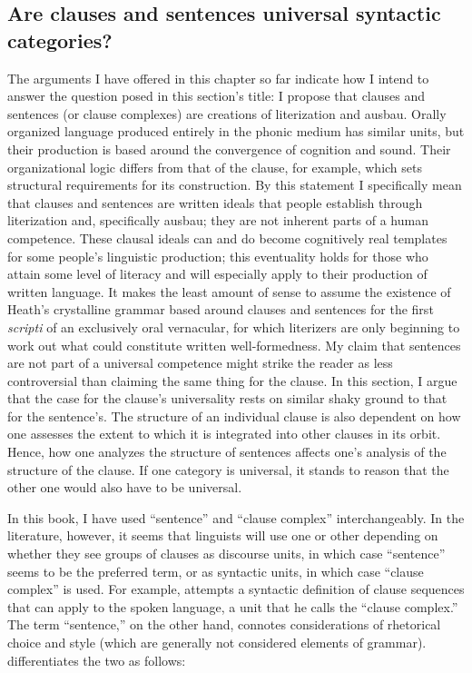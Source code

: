 \subsection{Are clauses and sentences universal syntactic categories? }\label{sec:7.2.2}

The arguments I have offered in this chapter so far indicate how I intend to answer the question posed in this section’s title: I propose that clauses and sentences (or clause complexes) are creations of literization and ausbau. Orally organized language produced entirely in the phonic medium has similar units, but their production is based around the convergence of cognition and sound. Their organizational logic differs from that of the clause, for example, which sets structural requirements for its construction. By this statement I specifically mean that clauses and sentences are written ideals that people establish through literization and, specifically ausbau; they are not inherent parts of a human competence. These clausal ideals can and do become cognitively real templates for some people’s linguistic production; this eventuality holds for those who attain some level of literacy and will especially apply to their production of written language. It makes the least amount of sense to assume the existence of Heath’s crystalline grammar based around clauses and sentences for the first \textit{scripti} of an exclusively oral vernacular, for which literizers are only beginning to work out what could constitute written well-formedness. My claim that sentences are not part of a universal competence might strike the reader as less controversial than claiming the same thing for the clause. In this section, I argue that the case for the clause’s universality rests on similar shaky ground to that for the sentence’s. The structure of an individual clause is also dependent on how one assesses the extent to which it is integrated into other clauses in its orbit. Hence, how one analyzes the structure of sentences affects one’s analysis of the structure of the clause. If one category is universal, it stands to reason that the other one would also have to be universal.

In this book, I have used “sentence” and “clause complex” interchangeably. In the literature, however, it seems that linguists will use one or other depending on whether they see groups of clauses as discourse units, in which case “sentence” seems to be the preferred term, or as syntactic units, in which case “clause complex” is used. For example, \citet[82--89]{Halliday1989} attempts a syntactic definition of clause sequences that can apply to the spoken language, a unit that he calls the “clause complex.” The term “sentence,” on the other hand, connotes considerations of rhetorical choice and style (which are generally not considered elements of grammar).  \citet[32--33]{MillerWeinert1998} differentiates the two as follows:

